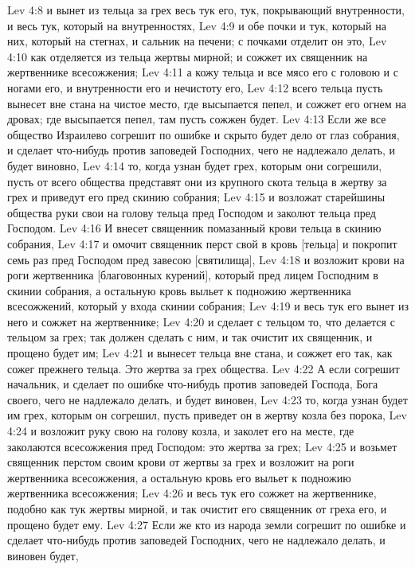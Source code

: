 \vs Lev 4:8 и вынет из тельца за грех весь тук его, тук, покрывающий внутренности, и весь тук, который на внутренностях,
\vs Lev 4:9 и обе почки и тук, который на них, который на стегнах, и сальник на печени; с почками отделит он это,
\vs Lev 4:10 как отделяется из тельца жертвы мирной; и сожжет их священник на жертвеннике всесожжения;
\vs Lev 4:11 а кожу тельца и все мясо его с головою и с ногами его, и внутренности его и нечистоту его,
\vs Lev 4:12 всего тельца пусть вынесет вне стана на чистое место, где высыпается пепел, и сожжет его огнем на дровах; где высыпается пепел, там пусть сожжен будет.
\rsbpar\vs Lev 4:13 Если же все общество Израилево согрешит по ошибке и скрыто будет дело от глаз собрания, и сделает что-нибудь против заповедей Господних, чего не надлежало делать, и будет виновно,
\vs Lev 4:14 то, когда узнан будет грех, которым они согрешили, пусть от всего общества представят они из крупного скота тельца в жертву за грех и приведут его пред скинию собрания;
\vs Lev 4:15 и возложат старейшины общества руки свои на голову тельца пред Господом и заколют тельца пред Господом.
\vs Lev 4:16 И внесет священник помазанный крови тельца в скинию собрания,
\vs Lev 4:17 и омочит священник перст свой в кровь [тельца] и покропит семь раз пред Господом пред завесою [святилища],
\vs Lev 4:18 и возложит крови на роги жертвенника [благовонных курений], который пред лицем Господним в скинии собрания, а остальную кровь выльет к подножию жертвенника всесожжений, который у входа скинии собрания;
\vs Lev 4:19 и весь тук его вынет из него и сожжет на жертвеннике;
\vs Lev 4:20 и сделает с тельцом то, что делается с тельцом за грех; так должен сделать с ним, и так очистит их священник, и прощено будет им;
\vs Lev 4:21 и вынесет тельца вне стана, и сожжет его так, как сожег прежнего тельца. Это жертва за грех общества.
\rsbpar\vs Lev 4:22 А если согрешит начальник, и сделает по ошибке что-нибудь против заповедей Господа, Бога своего, чего не надлежало делать, и будет виновен,
\vs Lev 4:23 то, когда узнан будет им грех, которым он согрешил, пусть приведет он в жертву козла без порока,
\vs Lev 4:24 и возложит руку свою на голову козла, и заколет его на месте, где заколаются всесожжения пред Господом: это жертва за грех;
\vs Lev 4:25 и возьмет священник перстом своим крови от жертвы за грех и возложит на роги жертвенника всесожжения, а остальную кровь его выльет к подножию жертвенника всесожжения;
\vs Lev 4:26 и весь тук его сожжет на жертвеннике, подобно как тук жертвы мирной, и так очистит его священник от греха его, и прощено будет ему.
\rsbpar\vs Lev 4:27 Если же кто из народа земли согрешит по ошибке и сделает что-нибудь против заповедей Господних, чего не надлежало делать, и виновен будет,

